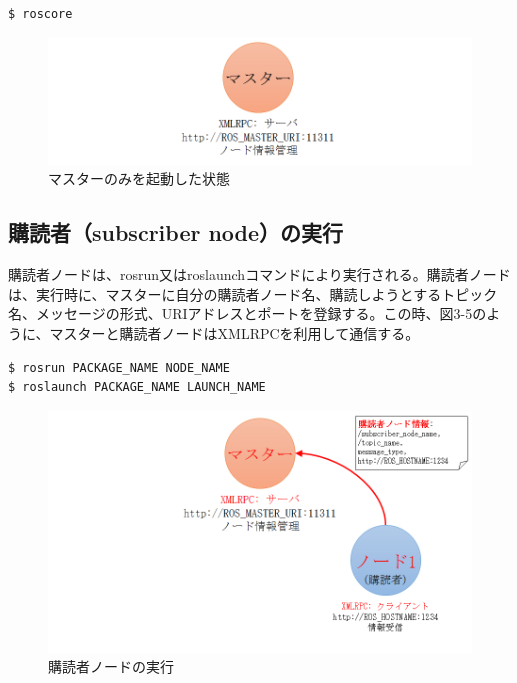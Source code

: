 \begin{lstlisting}[language=ROS]
$ roscore
\end{lstlisting}

\begin{figure}[h]
  \centering
  \includegraphics[width=12cm]{pictures/chapter3/pic_03_04.png}
  \caption{マスターのみを起動した状態}
\end{figure}

\subsection{購読者（subscriber node）の実行}
購読者ノードは、rosrun又はroslaunchコマンドにより実行される。購読者ノードは、実行時に、マスターに自分の購読者ノード名、購読しようとするトピック名、メッセージの形式、URIアドレスとポートを登録する。この時、図3-5のように、マスターと購読者ノードはXMLRPCを利用して通信する。

\begin{lstlisting}[language=ROS]
$ rosrun PACKAGE_NAME NODE_NAME
$ roslaunch PACKAGE_NAME LAUNCH_NAME
\end{lstlisting}

\begin{figure}[h]
  \centering
  \includegraphics[width=12cm]{pictures/chapter3/pic_03_05.png}
  \caption{購読者ノードの実行}
\end{figure}

